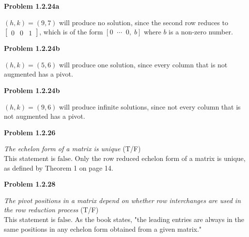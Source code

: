 \documentclass[12pt]{article}
\begin{document}
\newpage


\textbf{Problem 1.2.24a} \par
\vspace{12pt}
$\boxed{(h, k) = (9, 7)}$ will produce no solution, since the second row reduces to $\begin{bmatrix} 0 & 0 & 1 \end{bmatrix}$, which is of the form $[0 \;\; \cdots \;\; 0, \; b]$ where $b$ is a non-zero number. \par

\bigskip

\textbf{Problem 1.2.24b} \par
\vspace{12pt}
$\boxed{(h, k) = (5, 6)}$ will produce one solution, since every column that is not augmented has a pivot. \par

\bigskip

\textbf{Problem 1.2.24b} \par
\vspace{12pt}
$\boxed{(h, k) = (9, 6)}$ will produce infinite solutions, since not every column that is not augmented has a pivot. \par

\newpage

\textbf{Problem 1.2.26} \par
\textit{The echelon form of a matrix is unique} (T/F) \\[12pt]
This statement is $\boxed{\text{false}}$. Only the row reduced echelon form of a matrix is unique, as defined by Theorem 1 on page 14.

\newpage
\textbf{Problem 1.2.28} \par
\textit{The pivot positions in a matrix depend on whether row interchanges are used in the row reduction process} (T/F) \\[12pt]
This statement is $\boxed{\text{false}}$. As the book states, "the leading entries are always in the same positions in any echelon form obtained from a given matrix."
\end{document}
